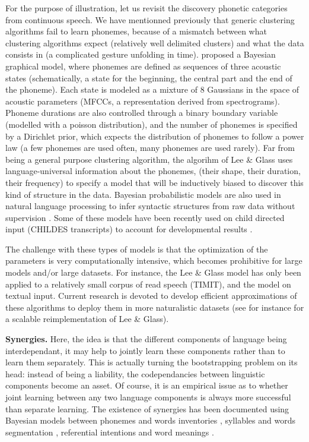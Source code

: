 \documentclass[jou,apacite]{apa6}
\renewcommand{\subsubsection}[1]{\textbf{#1}\hspace{0.3cm}}
\begin{document}
For the purpose of illustration, let us revisit the discovery phonetic categories from continuous speech. We have mentionned previously that generic clustering algorithms fail to learn phonemes, because of a mismatch between what clustering algorithms expect (relatively well delimited clusters) and what the data consists in (a complicated gesture unfolding in time). %
 proposed a Bayesian graphical model, where phonemes are defined as sequences of three acoustic states (schematically, a state for the beginning, the central part and the end of the phoneme). Each state is modeled as a mixture of 8 Gaussians in the space of acoustic parameters (MFCCs, a representation derived from spectrograms). Phoneme durations are also controlled through a binary boundary variable (modelled with a poisson distribution), and the number of phonemes is specified by a Dirichlet prior, which expects the distribution of phonemes to follow a power law (a few phonemes are used often, many phonemes are used rarely). Far from being a general purpose clustering algorithm, the algorihm of Lee \& Glass uses language-universal information about the phonemes, (their shape, their duration, their frequency) to specify a model that will be inductively biased to discover this kind of structure in the data. Bayesian probabilistic models are also used in natural language processing to infer syntactic structures from raw data without supervision
\cite{liang_2011,kwiatkowski_2012}. Some of these models have been recently used on child directed input (CHILDES transcripts) to account for developmental results \cite{abend_2017}. 

The challenge with these types of models is that the optimization of the parameters is very computationally intensive, which becomes prohibitive for large models and/or large datasets. For instance, the Lee \& Glass model has only been applied to a relatively small corpus of read speech (TIMIT), and the  model on textual input.  Current research is devoted to develop efficient approximations of these algorithms to deploy them in more naturalistic datasets (see for instance  for a scalable reimplementation of Lee \& Glass).




\subsubsection{Synergies.} Here, the idea is that the different components 
of language being interdependant, it may help to jointly learn these components rather than to learn them separately. This is actually turning the bootstrapping problem on its head: instead of being a liability, the codependancies between linguistic components become an asset. Of course, it is an empirical issue as to whether joint learning between any two language components is always more successful than separate learning.  The existence of synergies has been documented using Bayesian models between phonemes and words inventories \cite{feldman_2011}, syllables and words segmentation \cite{johnson_2008}, referential intentions and word meanings \cite{frank_2009}.
\end{document}
